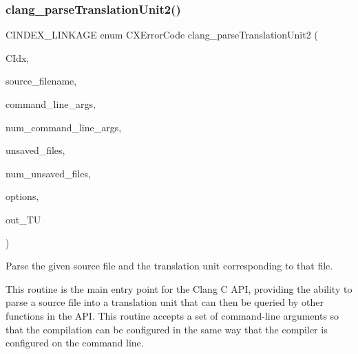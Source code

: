 \subsubsection{\texorpdfstring{clang\+\_\+parse\+Translation\+Unit2()}{clang\_parseTranslationUnit2()}}
{\footnotesize\ttfamily C\+I\+N\+D\+E\+X\+\_\+\+L\+I\+N\+K\+A\+GE enum C\+X\+Error\+Code clang\+\_\+parse\+Translation\+Unit2 (\begin{DoxyParamCaption}\item[{\mbox{\hyperlink{group__CINDEX_gae039c2574bfd75774ca7a9a3e55910cb}{C\+X\+Index}}}]{C\+Idx,  }\item[{const char $\ast$}]{source\+\_\+filename,  }\item[{const char $\ast$const $\ast$}]{command\+\_\+line\+\_\+args,  }\item[{int}]{num\+\_\+command\+\_\+line\+\_\+args,  }\item[{struct \mbox{\hyperlink{structCXUnsavedFile}{C\+X\+Unsaved\+File}} $\ast$}]{unsaved\+\_\+files,  }\item[{unsigned}]{num\+\_\+unsaved\+\_\+files,  }\item[{unsigned}]{options,  }\item[{\mbox{\hyperlink{group__CINDEX_gacdb7815736ca709ce9a5e1ec2b7e16ac}{C\+X\+Translation\+Unit}} $\ast$}]{out\+\_\+\+TU }\end{DoxyParamCaption})}



Parse the given source file and the translation unit corresponding to that file. 

This routine is the main entry point for the Clang C A\+PI, providing the ability to parse a source file into a translation unit that can then be queried by other functions in the A\+PI. This routine accepts a set of command-\/line arguments so that the compilation can be configured in the same way that the compiler is configured on the command line.


